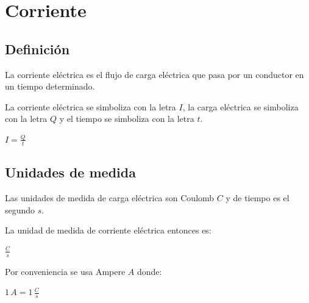 \documentclass[../principal.tex]{subfiles}
\begin{document}

\chapter{Corriente}

\section{Definición}

La corriente eléctrica es el flujo de carga eléctrica que pasa por un conductor en un tiempo determinado.

La corriente eléctrica se simboliza con la letra $I$, la carga eléctrica se simboliza con la letra $Q$ y el tiempo se simboliza con la letra $t$.

$I = \frac{Q}{t}$


\section{Unidades de medida}

Las unidades de medida de carga eléctrica son Coulomb $C$ y de tiempo es el segundo $s$.

La unidad de medida de corriente eléctrica entonces es:

$\frac{C}{s}$

Por conveniencia se usa Ampere $A$ donde:

$1 \, A = 1 \, \frac{C}{s}$
\end{document}
